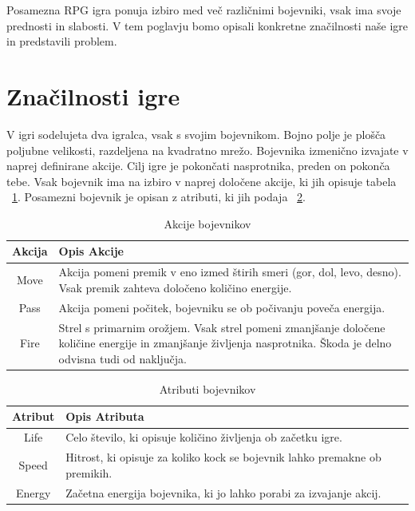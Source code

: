 \documentclass[12pt,a4paper,openany]{book}
\begin{document}
Posamezna RPG igra ponuja izbiro med več različnimi bojevniki, vsak ima svoje prednosti in slabosti. V tem poglavju bomo opisali konkretne značilnosti naše igre in predstavili problem.

\section{Značilnosti igre}
V igri sodelujeta dva igralca, vsak s svojim bojevnikom. Bojno polje je plošča poljubne velikosti, razdeljena na kvadratno mrežo. Bojevnika izmenično izvajate v naprej definirane akcije. Cilj igre je pokončati nasprotnika, preden on pokonča tebe. Vsak bojevnik ima na izbiro v naprej določene akcije, ki jih opisuje tabela ~\ref{table:akcijeBojevnikov}. Posamezni bojevnik je opisan z atributi, ki jih podaja ~\ref{table:atributiBojevnikov}.


\begin{table}[ht] \caption{Akcije bojevnikov}
\centering
\begin{tabular}{cp{10cm}}
\hline\hline
Akcija & Opis Akcije \\ [0.5ex]
\hline 
Move & Akcija pomeni premik v eno izmed štirih smeri (gor, dol, levo, desno). Vsak premik zahteva določeno količino energije.\\
Pass & Akcija pomeni počitek, bojevniku se ob počivanju poveča energija.\\
Fire & Strel s primarnim orožjem. Vsak strel pomeni zmanjšanje določene količine energije in zmanjšanje življenja nasprotnika. Škoda je delno odvisna tudi od naključja.\\ [1ex]
\hline %
\end{tabular}
\label{table:akcijeBojevnikov} %
\end{table}

\begin{table}[ht] \caption{Atributi bojevnikov}
\centering
\begin{tabular}{cp{10cm}}
\hline\hline
Atribut & Opis Atributa \\ [0.5ex]
\hline 
Life & Celo število, ki opisuje količino življenja ob začetku igre.\\
Speed & Hitrost, ki opisuje za koliko kock se bojevnik lahko premakne ob premikih.\\
Energy & Začetna energija bojevnika, ki jo lahko porabi za izvajanje akcij.\\ [1ex]
\hline %
\end{tabular}
\label{table:atributiBojevnikov} %
\end{table}
\end{document}
